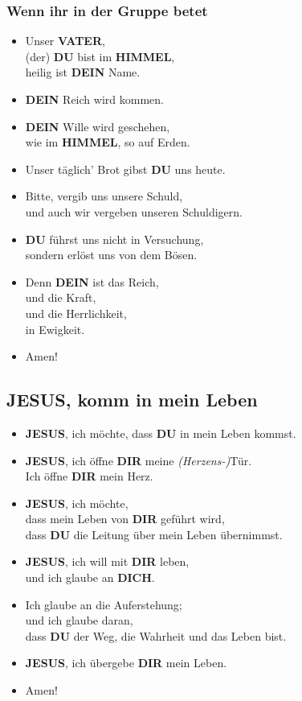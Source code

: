 \documentclass[10pt,a5paper]{article}
\newcommand{\Dein}[0]{\textbf{DEIN}}
\newcommand{\Dich}[0]{\textbf{DICH}}
\newcommand{\Dir}[0]{\textbf{DIR}}
\newcommand{\Du}[0]{\textbf{DU}}
\newcommand{\Himmel}[0]{\textbf{HIMMEL}}
\newcommand{\Jesus}[0]{\textbf{JESUS}}
\newcommand{\Vater}[0]{\textbf{VATER}}
\begin{document}
	\subsubsection{Wenn ihr in der Gruppe betet}
		\begin{itemize}[nosep]
			\item	Unser {\Vater},
					\\
					(der) {\Du} bist im {\Himmel},
					\\
					heilig ist {\Dein} Name.
			\item	{\Dein} Reich wird kommen.
			\item	{\Dein} Wille wird geschehen,
					\\
					wie im {\Himmel},
					so auf Erden.
			\item	Unser t\"aglich' Brot gibst {\Du} uns heute.
			\item	Bitte,
					vergib uns unsere Schuld,
					\\
					und auch wir vergeben unseren Schuldigern.
			\item	{\Du} f\"uhrst uns nicht in Versuchung,
					\\
					sondern erl\"ost uns von dem B\"osen.
			\item	Denn {\Dein} ist das Reich,
					\\
					und die Kraft,
					\\
					und die Herrlichkeit,
					\\
					in Ewigkeit.
			\item	Amen!
		\end{itemize}

	\subsection{{\Jesus}, komm in mein Leben}
		\begin{itemize}[nosep]
			\item	{\Jesus},
					ich m\"ochte,
					dass {\Du} in mein Leben kommst.
			\item	{\Jesus},
					ich \"offne {\Dir} meine \textit{(Herzens-)}T\"ur.
					\\
					Ich \"offne {\Dir} mein Herz.
			\item	{\Jesus},
					ich m\"ochte,
					\\
					dass mein Leben von {\Dir} gef\"uhrt wird,
					\\
					dass {\Du} die Leitung \"uber mein Leben \"ubernimmst.
			\item	{\Jesus},
					ich will mit {\Dir} leben,
					\\
					und ich glaube an {\Dich}.
			\item	Ich glaube an die Auferstehung;
					\\
					und ich glaube daran,
					\\
					dass {\Du} der Weg,
					die Wahrheit und das Leben bist.
			\item	{\Jesus},
					ich \"ubergebe {\Dir} mein Leben.
			\item	Amen!
		\end{itemize}
\end{document}
